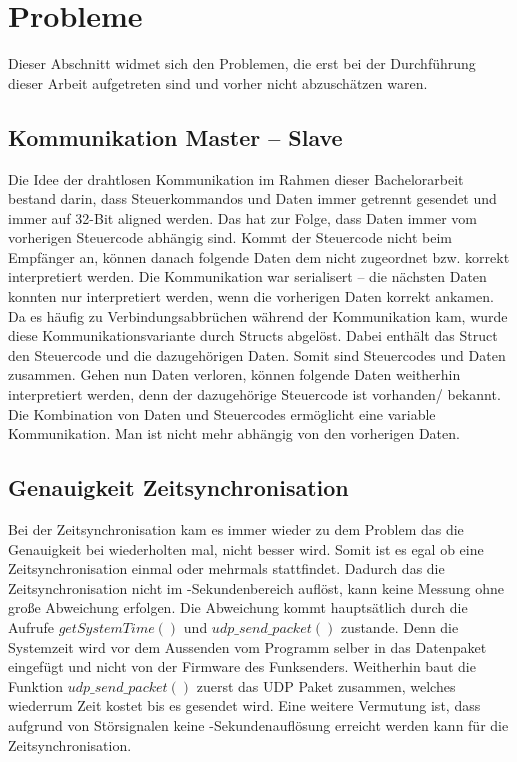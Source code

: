 \newpage
\section{Probleme}
Dieser Abschnitt widmet sich den Problemen, die erst bei der Durchführung dieser Arbeit aufgetreten sind und vorher nicht abzuschätzen waren.


\subsection{Kommunikation Master -- Slave}
Die Idee der drahtlosen Kommunikation im Rahmen dieser Bachelorarbeit bestand darin, dass Steuerkommandos und Daten immer getrennt gesendet und immer auf 32-Bit aligned werden. Das hat zur Folge, dass Daten immer vom vorherigen Steuercode abhängig sind. Kommt der Steuercode nicht beim Empfänger an, können danach folgende Daten dem nicht zugeordnet bzw. korrekt interpretiert werden. Die Kommunikation war serialisert -- die nächsten Daten konnten nur interpretiert werden, wenn die vorherigen Daten korrekt ankamen. Da es häufig zu Verbindungsabbrüchen während der Kommunikation kam, wurde diese Kommunikationsvariante durch Structs abgelöst. Dabei enthält das Struct den Steuercode und die dazugehörigen Daten. Somit sind Steuercodes und Daten zusammen. Gehen nun Daten verloren, können folgende Daten weitherhin interpretiert werden, denn der dazugehörige Steuercode ist vorhanden/ bekannt. Die Kombination von Daten und Steuercodes ermöglicht eine variable Kommunikation. Man ist nicht mehr abhängig von den vorherigen Daten.

\subsection{Genauigkeit Zeitsynchronisation}
Bei der Zeitsynchronisation kam es immer wieder zu dem Problem das die Genauigkeit bei wiederholten mal, nicht besser wird. Somit ist es egal ob eine Zeitsynchronisation einmal oder mehrmals stattfindet. Dadurch das die Zeitsynchronisation nicht im \si{\mu}-Sekundenbereich auflöst, kann keine Messung ohne große Abweichung erfolgen. Die Abweichung kommt hauptsätlich durch die Aufrufe $getSystemTime()$ und $udp\_send\_packet()$ zustande. Denn die Systemzeit wird vor dem Aussenden vom Programm selber in das Datenpaket eingefügt und nicht von der Firmware des Funksenders. Weitherhin baut die Funktion $udp\_send\_packet()$ zuerst das UDP Paket zusammen, welches wiederrum Zeit kostet bis es gesendet wird. Eine weitere Vermutung ist, dass aufgrund von Störsignalen keine \si{\mu}-Sekundenauflösung erreicht werden kann für die Zeitsynchronisation. 

